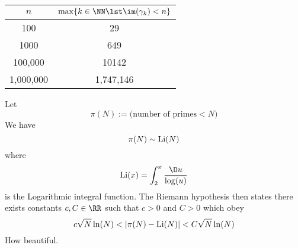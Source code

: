 \medskip
\begin{center}
\begin{tabular}{cc}
\toprule
$n$ & $\max\{k\in\NN\lst\im(\gamma_{k})<n\}$  \\
\midrule
100       & 29\\
1000      & 649\\
100,000   & 10142\\
1,000,000 & 1,747,146\\
\bottomrule
\end{tabular}
\end{center}


Let
\begin{equation}
\pi(N):=\mbox{(number of primes$<N$)}
\end{equation}
We have
\begin{equation}
\pi(N)\sim \mathop{\mathrm{Li}}\nolimits(N)
\end{equation}
where
\begin{equation}
\Li(x)=\int^{x}_{2}\frac{\D u}{\log(u)}
\end{equation}
is the Logarithmic integral function. The Riemann hypothesis then
states there exists constants $c,C\in\RR$ such that $c>0$
and $C>0$ which obey
\begin{equation}
c\sqrt{N}\ln(N)<|\pi(N)-\Li(N)|<C\sqrt{N}\ln(N)
\end{equation}
How beautiful.

